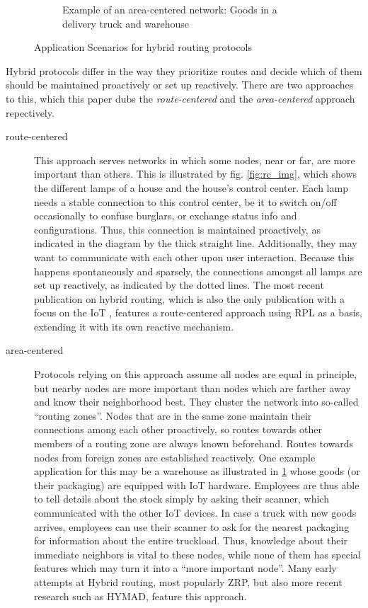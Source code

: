 \documentclass[a4paper,10pt]{scrartcl}
\begin{document}
\begin{figure}
\begin{subfigure}[b]{0.5\textwidth}
                \caption{Example of an area-centered network: Goods in a delivery truck and warehouse}
                \label{fig:ac_img}
        \end{subfigure}
        \caption{Application Scenarios for hybrid routing protocols}\label{fig:scope}
\end{figure}

Hybrid protocols differ in the way they prioritize routes and decide which of them should be maintained proactively or set up reactively. There are two approaches to this, which this paper dubs the \emph{route-centered} and the \emph{area-centered} approach repectively.\\

\begin{description}
\item[route-centered] This approach serves networks in which some nodes, near or far, are more important than others. This is illustrated by fig. \ref{fig:rc_img}, which shows the different lamps of a house and the house's control center. Each lamp needs a stable connection to this control center, be it to switch on/off occasionally to confuse burglars, or exchange status info and configurations. Thus, this connection is maintained proactively, as indicated in the diagram by the thick straight line. Additionally, they may want to communicate with each other upon user interaction. Because this happens spontaneously and sparsely, the connections amongst all lamps are set up reactively, as indicated by the dotted lines.
The most recent publication on hybrid routing, which is also the only publication with a focus on the IoT \cite{RFC-6997}, features a route-centered approach using \gls{RPL}\cite{RFC-6550} as a basis, extending it with its own reactive mechanism.
\\
\item[area-centered] Protocols relying on this approach assume all nodes are equal in principle, but nearby nodes are more important than nodes which are farther away and know their neighborhood best. They cluster the network into so-called ``routing zones''. Nodes that are in the same zone maintain their connections among each other proactively, so routes towards other members of a routing zone are always known beforehand. Routes towards nodes from foreign zones are established reactively. 
One example application for this may be a warehouse as illustrated in \ref{fig:ac_img} whose goods (or their packaging) are equipped with IoT hardware. Employees are thus able to tell details about the stock simply by asking their scanner, which communicated with the other IoT devices. In case a truck with new goods arrives, employees can use their scanner to ask for the nearest packaging for information about the entire truckload. Thus, knowledge about their immediate neighbors is vital to these nodes, while none of them has special features which may turn it into a ``more important node''. Many early attempts at Hybrid routing, most popularly \gls{ZRP}, but also more recent research such as HYMAD, feature this approach.
\end{description}
\end{document}
